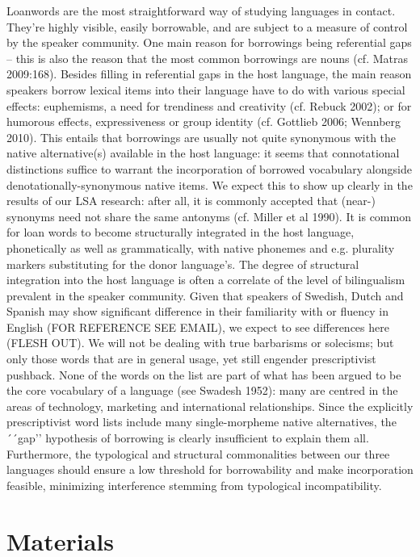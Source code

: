 \documentclass[a4paper]{article}
\begin{document}
Loanwords are the most straightforward way of studying languages in contact. They’re highly visible, easily borrowable, and are subject to a measure of control by the speaker community. One main reason for borrowings being referential gaps – this is also the reason that the most common borrowings are nouns (cf. Matras 2009:168).
Besides filling in referential gaps in the host language, the main reason speakers borrow lexical items into their language have to do with various special effects: euphemisms, a need for trendiness and creativity (cf. Rebuck 2002); or for humorous effects, expressiveness or group identity (cf. Gottlieb 2006; Wennberg 2010). This entails that borrowings are usually not quite synonymous with the native alternative(s) available in the host language: it seems that connotational distinctions suffice to warrant the incorporation of borrowed vocabulary alongside denotationally-synonymous native items. We expect this to show up clearly in the results of our LSA research: after all, it is commonly accepted that (near-) synonyms need not share the same antonyms (cf. Miller et al 1990). 
It is common for loan words to become structurally integrated in the host language, phonetically as well as grammatically, with native phonemes and e.g. plurality markers substituting for the donor language’s. The degree of structural integration into the host language is often a correlate of the level of bilingualism prevalent in the speaker community. Given that speakers of Swedish, Dutch and Spanish may show significant difference in their familiarity with or fluency in English (FOR REFERENCE SEE EMAIL), we expect to see differences here (FLESH OUT). 
We will not be dealing with true barbarisms or solecisms; but only those words that are in general usage, yet still engender prescriptivist pushback. None of the words on the list are part of what has been argued to be the core vocabulary of a language (see Swadesh 1952): many are centred in the areas of technology, marketing and international relationships. Since the explicitly prescriptivist word lists include many single-morpheme native alternatives, the ´´gap’’ hypothesis of borrowing is clearly insufficient to explain them all. Furthermore, the typological and structural commonalities between our three languages should ensure a low threshold for borrowability and make incorporation feasible, minimizing interference stemming from typological incompatibility.




\cite{Matras2009}

\section{Materials} 
\end{document}
